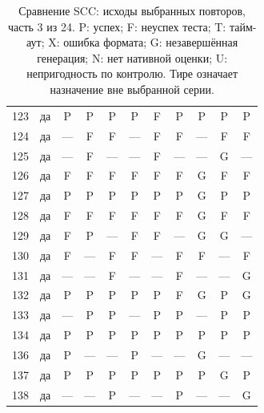 \begin{table}[p]
\begin{tabular*}{\textwidth}{@{\extracolsep{\fill}}rc*{9}{c}@{}}
123 & да & P & P & P & P & F & P & P & P & P\\
124 & да & — & F & F & — & F & F & — & F & F\\
125 & да & — & F & — & — & F & — & — & G & —\\
126 & да & F & F & F & F & F & F & G & F & F\\
127 & да & P & P & P & P & P & P & G & P & P\\
128 & да & F & F & F & F & F & F & G & F & F\\
129 & да & F & P & — & F & F & — & G & G & —\\
130 & да & F & — & F & F & — & F & F & — & F\\
131 & да & — & — & F & — & — & F & — & — & G\\
132 & да & P & P & P & P & P & F & G & P & G\\
133 & да & — & P & P & — & P & P & — & P & P\\
134 & да & P & P & P & P & P & P & P & P & P\\
136 & да & P & — & — & P & — & — & G & — & —\\
137 & да & P & P & P & P & P & P & P & G & P\\
138 & да & — & — & P & — & — & P & — & — & G\\
\bottomrule\end{tabular*}
\caption{Сравнение SCC: исходы выбранных повторов, часть 3 из 24. P: успех; F: неуспех теста; T: тайм-аут; X: ошибка формата; G: незавершённая генерация; N: нет нативной оценки; U: непригодность по контролю. Тире означает назначение вне выбранной серии.}
\end{table}
\clearpage

